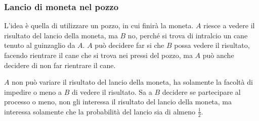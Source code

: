 \subsubsection{Lancio di moneta nel pozzo}
L'idea è quella di utilizzare un pozzo, in cui finirà la moneta. $A$ riesce a vedere il risultato
del lancio della moneta, ma $B$ no, perché si trova di intralcio un cane tenuto 
al guinzaglio da $A$. $A$ può decidere far si che $B$ possa vedere il risultato, facendo rientrare 
il cane che si trova nei pressi del pozzo, ma $A$ può anche decidere di non far rientrare il cane.

$A$ non può variare il risultato del lancio della moneta, ha solamente la facoltà di impedire o meno 
a $B$ di vedere il risultato. Sa a $B$ decidere se partecipare al processo o meno, non gli interessa
il risultato del lancio della moneta, ma interessa solamente che la probabilità del lancio sia di 
almeno $\frac{1}{2}$.
